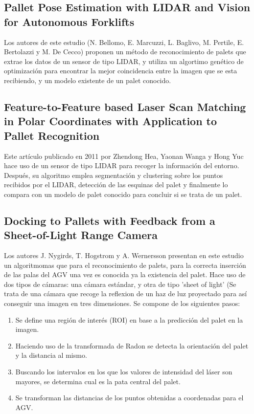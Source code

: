 \begin{itemize}
\subsection{Pallet Pose Estimation with LIDAR and Vision for Autonomous Forklifts}
Los autores de este estudio (N. Bellomo, E. Marcuzzi, L. Baglivo, M. Pertile, E. Bertolazzi y M. De Cecco) proponen un método de reconocimiento de palets que extrae los datos de un sensor de tipo LIDAR, y utiliza un algortimo genético de optimización para encontrar la mejor coincidencia entre la imagen que se esta recibiendo, y un modelo existente de un palet conocido.

\subsection{Feature-to-Feature based Laser Scan Matching in Polar Coordinates with Application to Pallet Recognition}
Este artículo publicado en 2011 por Zhendong Hea, Yaonan Wanga y Hong Yuc hace uso de un sensor de tipo LIDAR para recoger la información del entorno.
Después, su algoritmo emplea segmentación y clustering sobre los puntos recibidos por el LIDAR, detección de las esquinas del palet y finalmente lo compara con un modelo de palet conocido para concluir si se trata de un palet.

\subsection{Docking to Pallets with Feedback from a Sheet-of-Light Range Camera
}
Los autores J. Nygirds, T. Hogstrom y A. Wernersson presentan en este estudio un algoritmomas que para el reconocimiento de palets, para la correcta inserción de las palas del AGV una vez es conocida ya la existencia del palet. Hace uso de dos tipos de cámaras: una cámara estándar, y otra de tipo 'sheet of light' (Se trata de una cámara que recoge la reflexion de un haz de luz proyectado para así conseguir una imagen en tres dimensiones.
Se compone de los siguientes pasos:
\begin{enumerate}

\item Se define una región de interés (ROI) en base a la predicción del palet en la imagen.
\item Haciendo uso de la transformada de Radon se detecta la orientación del palet y la distancia al mismo.
\item Buscando los intervalos en los que los valores de intensidad del láser son mayores, se determina cual es la pata central del palet.
\item Se transforman las distancias de los puntos obtenidas a coordenadas para el AGV.
\end{enumerate}



\end{itemize}
